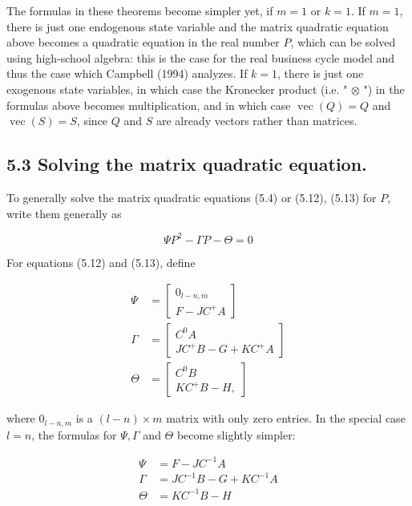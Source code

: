 \documentclass[10pt]{article}
\begin{document}
The formulas in these theorems become simpler yet, if $m=1$ or $k=1$. If $m=1$, there is just one endogenous state variable and the matrix quadratic equation\\
above becomes a quadratic equation in the real number $P$, which can be solved using high-school algebra: this is the case for the real business cycle model and thus the case which Campbell (1994) analyzes. If $k=1$, there is just one exogenous state variables, in which case the Kronecker product (i.e. " $\otimes$ ") in the formulas above becomes multiplication, and in which case $\operatorname{vec}(Q)=Q$ and $\operatorname{vec}(S)=S$, since $Q$ and $S$ are already vectors rather than matrices.

\subsection*{5.3 Solving the matrix quadratic equation.}
To generally solve the matrix quadratic equations (5.4) or (5.12), (5.13) for $P$, write them generally as

\begin{equation*}
\Psi P^{2}-\Gamma P-\Theta=0 \tag{5.20}
\end{equation*}

For equations (5.12) and (5.13), define

\begin{equation*}
\begin{aligned}
\Psi & =\left[\begin{array}{c}
0_{l-n, m} \\
F-J C^{+} A
\end{array}\right] \\
\Gamma & =\left[\begin{array}{c}
C^{0} A \\
J C^{+} B-G+K C^{+} A
\end{array}\right] \\
\Theta & =\left[\begin{array}{c}
C^{0} B \\
K C^{+} B-H,
\end{array}\right]
\end{aligned}
\end{equation*}

where $0_{l-n, m}$ is a $(l-n) \times m$ matrix with only zero entries. In the special case $l=n$, the formulas for $\Psi, \Gamma$ and $\Theta$ become slightly simpler:

\begin{equation*}
\begin{aligned}
\Psi & =F-J C^{-1} A \\
\Gamma & =J C^{-1} B-G+K C^{-1} A \\
\Theta & =K C^{-1} B-H
\end{aligned}
\end{equation*}
\end{document}
